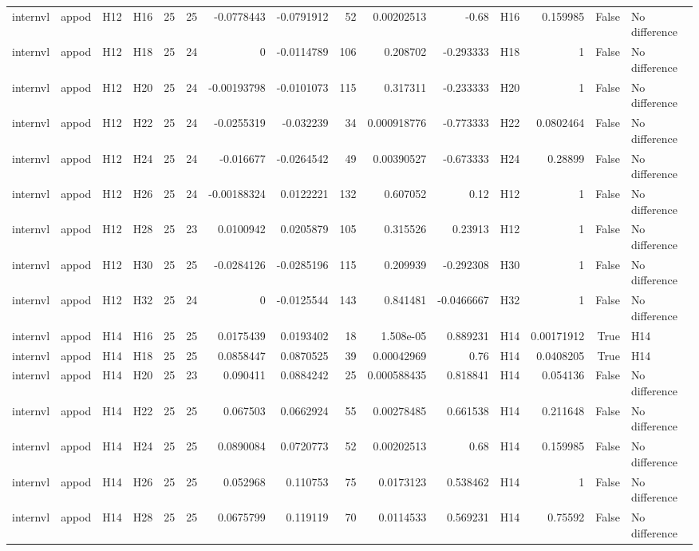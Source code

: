 \begin{longtable}{llllrrrrrrrlrrl}
internvl & appod & H12 & H16 & 25 & 25 & -0.0778443 & -0.0791912 & 52 & 0.00202513 & -0.68 & H16 & 0.159985 & False & No difference \\
internvl & appod & H12 & H18 & 25 & 24 & 0 & -0.0114789 & 106 & 0.208702 & -0.293333 & H18 & 1 & False & No difference \\
internvl & appod & H12 & H20 & 25 & 24 & -0.00193798 & -0.0101073 & 115 & 0.317311 & -0.233333 & H20 & 1 & False & No difference \\
internvl & appod & H12 & H22 & 25 & 24 & -0.0255319 & -0.032239 & 34 & 0.000918776 & -0.773333 & H22 & 0.0802464 & False & No difference \\
internvl & appod & H12 & H24 & 25 & 24 & -0.016677 & -0.0264542 & 49 & 0.00390527 & -0.673333 & H24 & 0.28899 & False & No difference \\
internvl & appod & H12 & H26 & 25 & 24 & -0.00188324 & 0.0122221 & 132 & 0.607052 & 0.12 & H12 & 1 & False & No difference \\
internvl & appod & H12 & H28 & 25 & 23 & 0.0100942 & 0.0205879 & 105 & 0.315526 & 0.23913 & H12 & 1 & False & No difference \\
internvl & appod & H12 & H30 & 25 & 25 & -0.0284126 & -0.0285196 & 115 & 0.209939 & -0.292308 & H30 & 1 & False & No difference \\
internvl & appod & H12 & H32 & 25 & 24 & 0 & -0.0125544 & 143 & 0.841481 & -0.0466667 & H32 & 1 & False & No difference \\
internvl & appod & H14 & H16 & 25 & 25 & 0.0175439 & 0.0193402 & 18 & 1.508e-05 & 0.889231 & H14 & 0.00171912 & True & H14 \\
internvl & appod & H14 & H18 & 25 & 25 & 0.0858447 & 0.0870525 & 39 & 0.00042969 & 0.76 & H14 & 0.0408205 & True & H14 \\
internvl & appod & H14 & H20 & 25 & 23 & 0.090411 & 0.0884242 & 25 & 0.000588435 & 0.818841 & H14 & 0.054136 & False & No difference \\
internvl & appod & H14 & H22 & 25 & 25 & 0.067503 & 0.0662924 & 55 & 0.00278485 & 0.661538 & H14 & 0.211648 & False & No difference \\
internvl & appod & H14 & H24 & 25 & 25 & 0.0890084 & 0.0720773 & 52 & 0.00202513 & 0.68 & H14 & 0.159985 & False & No difference \\
internvl & appod & H14 & H26 & 25 & 25 & 0.052968 & 0.110753 & 75 & 0.0173123 & 0.538462 & H14 & 1 & False & No difference \\
internvl & appod & H14 & H28 & 25 & 25 & 0.0675799 & 0.119119 & 70 & 0.0114533 & 0.569231 & H14 & 0.75592 & False & No difference \\

\end{longtable}
